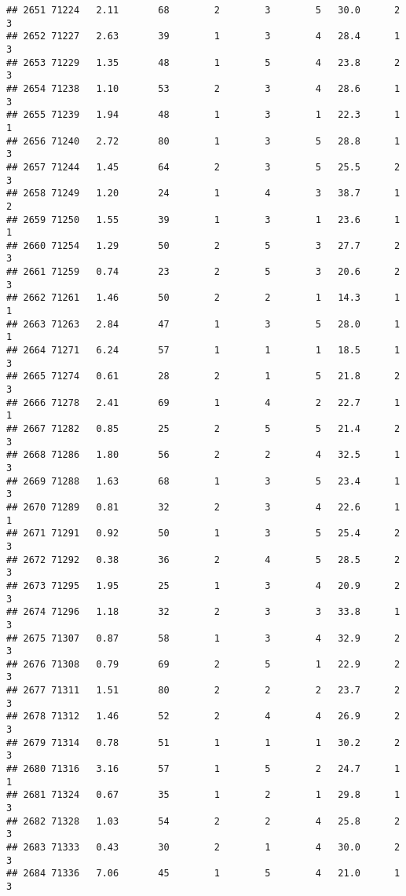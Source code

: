 \documentclass[
]{article}
\begin{document}
\begin{verbatim}
## 2651 71224   2.11       68        2        3        5   30.0      2      3
## 2652 71227   2.63       39        1        3        4   28.4      1      3
## 2653 71229   1.35       48        1        5        4   23.8      2      3
## 2654 71238   1.10       53        2        3        4   28.6      1      3
## 2655 71239   1.94       48        1        3        1   22.3      1      1
## 2656 71240   2.72       80        1        3        5   28.8      1      3
## 2657 71244   1.45       64        2        3        5   25.5      2      3
## 2658 71249   1.20       24        1        4        3   38.7      1      2
## 2659 71250   1.55       39        1        3        1   23.6      1      1
## 2660 71254   1.29       50        2        5        3   27.7      2      3
## 2661 71259   0.74       23        2        5        3   20.6      2      3
## 2662 71261   1.46       50        2        2        1   14.3      1      1
## 2663 71263   2.84       47        1        3        5   28.0      1      1
## 2664 71271   6.24       57        1        1        1   18.5      1      3
## 2665 71274   0.61       28        2        1        5   21.8      2      3
## 2666 71278   2.41       69        1        4        2   22.7      1      1
## 2667 71282   0.85       25        2        5        5   21.4      2      3
## 2668 71286   1.80       56        2        2        4   32.5      1      3
## 2669 71288   1.63       68        1        3        5   23.4      1      3
## 2670 71289   0.81       32        2        3        4   22.6      1      1
## 2671 71291   0.92       50        1        3        5   25.4      2      3
## 2672 71292   0.38       36        2        4        5   28.5      2      3
## 2673 71295   1.95       25        1        3        4   20.9      2      3
## 2674 71296   1.18       32        2        3        3   33.8      1      3
## 2675 71307   0.87       58        1        3        4   32.9      2      3
## 2676 71308   0.79       69        2        5        1   22.9      2      3
## 2677 71311   1.51       80        2        2        2   23.7      2      3
## 2678 71312   1.46       52        2        4        4   26.9      2      3
## 2679 71314   0.78       51        1        1        1   30.2      2      3
## 2680 71316   3.16       57        1        5        2   24.7      1      1
## 2681 71324   0.67       35        1        2        1   29.8      1      3
## 2682 71328   1.03       54        2        2        4   25.8      2      3
## 2683 71333   0.43       30        2        1        4   30.0      2      3
## 2684 71336   7.06       45        1        5        4   21.0      1      3

\end{verbatim}
\end{document}
